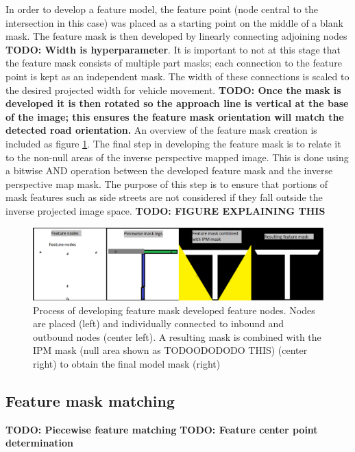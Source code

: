 \documentclass[]{aiaa-tc}%
\begin{document}
In order to develop a feature model, the feature point (node central to the intersection in this case) was placed as a starting point on the middle of a blank mask. The feature mask is then developed by linearly connecting adjoining nodes \textbf{TODO: Width is hyperparameter}. It is important to not at this stage that the feature mask consists of multiple part masks; each connection to the feature point is kept as an independent mask. The width of these connections is scaled to the desired projected width for vehicle movement. \textbf{TODO: Once the mask is developed it is then rotated so the approach line is vertical at the base of the image; this ensures the feature mask orientation will match the detected road orientation.} An overview of the feature mask creation is included as figure \ref{f:featureMaskDevelopment}. The final step in developing the feature mask is to relate it to the non-null areas of the inverse perspective mapped image. This is done using a bitwise AND operation between the developed feature mask and the inverse perspective map mask. The purpose of this step is to ensure that portions of mask features such as side streets are not considered if they fall outside the inverse projected image space. \textbf{TODO: FIGURE EXPLAINING THIS}

\begin{figure}
	\centering
	\includegraphics[width=1\textwidth]{FeatureMatching/featureMaskDevelopment.png}
	\caption{Process of developing feature mask developed feature nodes. Nodes are placed (left) and individually connected to inbound and outbound nodes (center left). A resulting mask is combined with the IPM mask (null area shown as TODOODODODO THIS) (center right) to obtain the final model mask (right)}
	\label{f:featureMaskDevelopment}
\end{figure}

\subsection{Feature mask matching}

\textbf{TODO: Piecewise feature matching}
\textbf{TODO: Feature center point determination}
\end{document}
